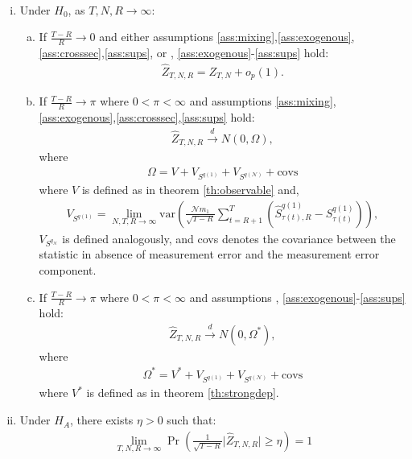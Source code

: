 \begin{corollary}
\label{cor:error} 

$\,$
\begin{enumerate}[(i)] 
\item Under $H_{0}$, as $T,N,R\rightarrow \infty$:
\begin{enumerate}[(a)] 
\item \label{cor:error, i} If $\frac{T-R}{R} \rightarrow 0$ and either assumptions \ref{ass:mixing},\ref{ass:exogenous},\ref{ass:crosssec},\ref{ass:sups}, or , \ref{ass:exogenous}-\ref{ass:sups} hold:
\begin{align}
\widehat{Z}_{T,N,R}=Z_{T,N}+o_{p}(1).  \label{No-PEE}
\end{align}

\item If $\frac{T-R}{R} \rightarrow \pi $ where $0<\pi <\infty$ and assumptions \ref{ass:mixing},\ref{ass:exogenous},\ref{ass:crosssec},\ref{ass:sups} hold: 
\begin{align*}
	\widehat{Z}_{T,N,R}\overset{d}{\rightarrow }N\left( 0, \Omega \right),
\end{align*}
where
\begin{align*}
	\Omega = V+V_{S^{q(1)}}+V_{S^{q(\mathcal{N})}}+\text{covs}
\end{align*}
where $V$ is defined as in theorem \ref{th:observable} and, 
\begin{align*}
	V_{S^{q(1)}} = \lim_{N,T,R\rightarrow \infty }\mathrm{var}\left( \frac{\mathcal{N}m_{1}}{\sqrt{T-R}}\sum_{t=R+1}^{T}\left( \widehat{S}_{\tau(t),R}^{q(1)}-S_{\tau(t)}^{q(1)}\right) \right),
\end{align*}
$V_{S^{q_{\mathcal{N}}}}$ is defined analogously, and \textrm{covs} denotes the covariance between the statistic in absence of measurement error and the measurement error component.

\item If $\frac{T-R}{R} \rightarrow \pi $ where $0<\pi <\infty$ and assumptions , \ref{ass:exogenous}-\ref{ass:sups} hold: 
\begin{align*}
	\widehat{Z}_{T,N,R}\overset{d}{\rightarrow }N\left( 0, \Omega^\ast \right),
\end{align*}
where
\begin{align*}
	\Omega^\ast = V^\ast + V_{S^{q(1)}}+V_{S^{q(\mathcal{N})}}+\text{covs}
\end{align*}
where $V^\ast$ is defined as in theorem \ref{th:strongdep}.
\end{enumerate}

\item Under $H_A$, there exists $\eta > 0$ such that:
\begin{align*}
 	\lim_{T,N,R \rightarrow \infty } \Pr \left( \frac{1}{\sqrt{T-R}} \lvert \widehat{Z}_{T,N,R} \rvert \geq \eta \right) = 1
\end{align*}
\end{enumerate}
\end{corollary}

